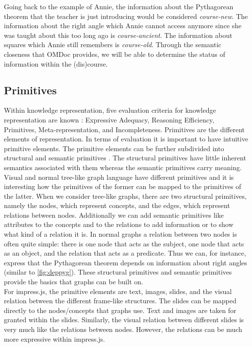 \documentclass[twoside, 12pt]{article}
\begin{document}
Going back to the example of Annie, the information about the Pythagorean theorem that the teacher is just introducing would be considered \textit{course-new}. The information about the right angle which Annie cannot access anymore since she was taught about this too long ago is \textit{course-ancient}. The information about squares which Annie still remembers is \textit{course-old}. Through the semantic closeness that OMDoc provides, we will be able to determine the status of information within the (dis)course.\\

\subsection{Primitives}
\label{sec:primitives}

Within knowledge representation, five evaluation criteria for knowledge representation are known \cite{Kohlhase:Complog:base}: Expressive Adequacy, Reasoning Efficiency, Primitives, Meta-representation, and Incompleteness. Primitives are the different elements of representation. In terms of evaluation it is important to have intuitive primitive elements. The primitive elements can be further subdivided into structural and semantic primitives \cite{DBLP:dblp_conf/acl/Salveter80}. The structural primitives have little inherent semantics associated with them whereas the semantic primitives carry meaning.\\

Visual and normal tree-like graph language have different primitives and it is interesting how the primitives of the former can be mapped to the primitives of the latter. When we consider tree-like graphs, there are two structural primitives, namely the nodes, which represent concepts, and the edges, which represent relations between nodes. Additionally we can add semantic primitives like attributes to the concepts and to the relations to add information or to show what kind of a relation it is. In normal graphs a relation between two nodes is often quite simple: there is one node that acts as the subject, one node that acts as an object, and the relation that acts as a predicate. Thus we can, for instance, express that the Pythagorean theorem depends on information about right angles (similar to \autoref{fig:deppyg}). These structural primitives and semantic primitives provide the basics that graphs can be built on.\\

For impress.js, the primitive elements are text, images, slides, and the visual relation between the different frame-like structures. The slides can be mapped directly to the nodes/concepts that graphs use. Text and images are taken for granted within the slides. Similarly, the visual relation between different slides is very much like the relations between nodes. However, the relations can be much more expressive within impress.js.\\
\end{document}

